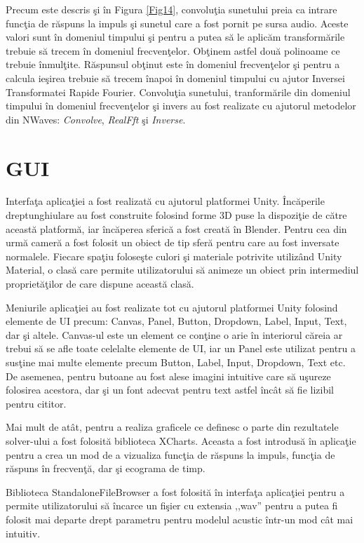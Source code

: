 	Precum este descris \c{s}i \^{i}n Figura \ref{Fig14}, convolu\c{t}ia sunetului preia ca intrare func\c{t}ia de r\u{a}spuns la impuls \c{s}i sunetul care a fost pornit pe sursa audio. Aceste valori sunt \^{i}n domeniul timpului \c{s}i pentru a putea s\u{a} le aplic\u{a}m transform\u{a}rile trebuie s\u{a} trecem \^{i}n domeniul frecven\c{t}elor. Ob\c{t}inem astfel dou\u{a} polinoame ce trebuie \^{i}nmul\c{t}ite. R\u{a}spunsul ob\c{t}inut este \^{i}n domeniul frecven\c{t}elor \c{s}i pentru a calcula ie\c{s}irea trebuie s\u{a} trecem \^{i}napoi \^{i}n domeniul timpului cu ajutor Inversei Transformatei Rapide Fourier. Convolu\c{t}ia sunetului, tranform\u{a}rile din domeniul timpului \^{i}n domeniul frecven\c{t}elor \c{s}i invers au fost realizate cu ajutorul metodelor din NWaves: \textit{Convolve}, \textit{RealFft} \c{s}i \textit{Inverse}.

\section{GUI}

	Interfa\c{t}a aplica\c{t}iei a fost realizat\u{a} cu ajutorul platformei Unity. \^{I}nc\u{a}perile dreptunghiulare au fost construite folosind forme 3D puse la dispozi\c{t}ie de c\u{a}tre aceast\u{a} platform\u{a}, iar \^{i}nc\u{a}perea sferic\u{a} a fost creat\u{a} \^{i}n Blender. Pentru cea din urm\u{a} camer\u{a} a fost folosit un obiect de tip sfer\u{a} pentru care au fost inversate normalele. Fiecare spa\c{t}iu folose\c{s}te culori \c{s}i materiale potrivite utiliz\^{a}nd Unity Material, o clas\u{a} care permite utilizatorului s\u{a} animeze un obiect prin intermediul propriet\u{a}\c{t}ilor de care dispune aceast\u{a} clas\u{a}.
	\bigskip
	
	Meniurile aplica\c{t}iei au fost realizate tot cu ajutorul platformei Unity folosind elemente de UI precum: Canvas, Panel, Button, Dropdown, Label, Input, Text, dar \c{s}i altele. Canvas-ul este un element ce con\c{t}ine o arie \^{i}n interiorul c\u{a}reia ar trebui s\u{a} se afle toate celelalte elemente de UI, iar un Panel este utilizat pentru a sus\c{t}ine mai multe elemente precum Button, Label, Input, Dropdown, Text etc. De asemenea, pentru butoane au fost alese imagini intuitive care s\u{a} u\c{s}ureze folosirea acestora, dar \c{s}i un font adecvat pentru text astfel \^{i}nc\^{a}t s\u{a} fie lizibil pentru cititor.
	\bigskip
	
	Mai mult de at\^{a}t, pentru a realiza graficele ce definesc o parte din rezultatele solver-ului a fost folosit\u{a} biblioteca XCharts. Aceasta a fost introdus\u{a} \^{i}n aplica\c{t}ie pentru a crea un mod de a vizualiza func\c{t}ia de r\u{a}spuns la impuls, func\c{t}ia de r\u{a}spuns \^{i}n frecven\c{t}\u{a}, dar \c{s}i ecograma de timp.
	\bigskip
	
	Biblioteca StandaloneFileBrowser a fost folosit\u{a} \^{i}n interfa\c{t}a aplica\c{t}iei pentru a permite utilizatorului s\u{a} \^{i}ncarce un fi\c{s}ier cu extensia ,,wav'' pentru a putea fi folosit mai departe drept parametru pentru modelul acustic \^{i}ntr-un mod c\^{a}t mai intuitiv.
	